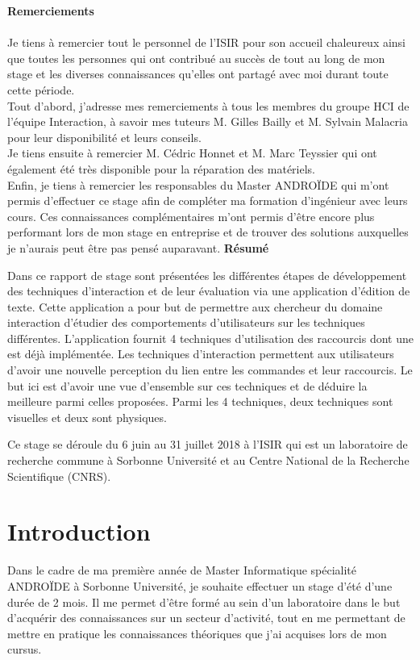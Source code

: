 \documentclass[12pt,a4paper]{article}
\begin{document}
{\huge \textbf{Remerciements}}\\
\vspace{0.5cm}\\
Je tiens à remercier tout le personnel de l'ISIR pour son accueil
chaleureux ainsi que toutes les personnes qui ont contribué au succès de tout au long de mon stage et les diverses connaissances qu'elles ont partagé avec moi durant toute cette période.
\vspace{0.5cm}\\
Tout d'abord, j'adresse mes remerciements à tous les membres du groupe HCI de l'équipe Interaction, à savoir mes tuteurs M. Gilles Bailly et M. Sylvain Malacria pour leur disponibilité et leurs conseils.
\vspace{0.5cm}\\
Je tiens ensuite à remercier M. Cédric Honnet et M. Marc Teyssier qui ont également été très disponible pour la réparation des matériels.
\vspace{0.5cm}\\
Enfin, je tiens à remercier les responsables du Master ANDROÏDE qui m'ont permis d'effectuer ce stage afin de compléter ma formation d'ingénieur avec leurs cours. Ces connaissances complémentaires m'ont permis d'être encore plus performant lors de mon stage en entreprise et de trouver des
solutions auxquelles je n'aurais peut être pas pensé auparavant.
\newpage
{\huge \textbf{Résumé}}\\
\vspace{0.5cm}

Dans ce rapport de stage sont présentées les différentes étapes de développement des techniques d'interaction et de leur évaluation via une application d'édition de texte. Cette application a pour but de
permettre aux chercheur du domaine interaction d'étudier des comportements d'utilisateurs sur les techniques différentes. L'application fournit 4 techniques d'utilisation des raccourcis dont une est déjà implémentée. Les techniques d'interaction permettent aux utilisateurs d'avoir une nouvelle perception du lien entre les commandes et leur raccourcis. Le but ici est d'avoir une vue d'ensemble sur ces techniques et de déduire la meilleure parmi celles proposées. Parmi les 4 techniques, deux techniques sont visuelles et deux sont physiques.

Ce stage se déroule du 6 juin au 31 juillet 2018 à l'ISIR qui est un laboratoire de recherche commune à Sorbonne Université et au Centre National de la Recherche Scientifique (CNRS).
\newpage
\tableofcontents
\newpage
\section{Introduction}
Dans le cadre de ma première année de Master Informatique spécialité ANDROÏDE à Sorbonne Université, je souhaite effectuer un stage d'été d'une durée de 2 mois. Il me permet d'être formé au sein d'un laboratoire dans le but d'acquérir des connaissances sur un secteur d'activité, tout en me permettant de mettre en pratique les connaissances théoriques que j'ai acquises lors de mon cursus.
\end{document}
